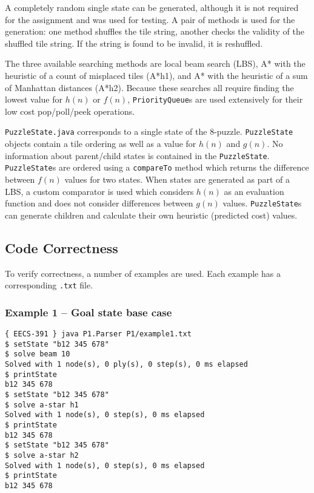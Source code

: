 \documentclass[letterpaper]{article}
\begin{document}
A completely random single state can be generated, although it is not required
for the assignment and was used for testing. A pair of methods is used for the
generation: one method shuffles the tile string, another checks the validity
of the shuffled tile string. If the string is found to be invalid, it is
reshuffled.

The three available searching methods are local beam search (LBS), A* with the
heuristic of a count of misplaced tiles (A*h1), and A* with the heuristic of a
sum of Manhattan distances (A*h2). Because these searches all require finding
the lowest value for $h(n)$ or $f(n)$, \texttt{PriorityQueue}s are used
extensively for their low cost pop/poll/peek operations.

\texttt{PuzzleState.java} corresponds to a single state of the 8-puzzle.
\texttt{PuzzleState} objects contain a tile ordering as well as a value for
$h(n)$ and $g(n)$. No information about parent/child states is contained in
the \texttt{PuzzleState}. \texttt{PuzzleState}s are ordered using a
\texttt{compareTo} method which returns the difference between $f(n)$ values
for two states. When states are generated as part of a LBS, a custom comparator
is used which considers $h(n)$ as an evaluation function and does not consider
differences between $g(n)$ values. \texttt{PuzzleState}s can generate children
and calculate their own heuristic (predicted cost) values.

\subsection*{Code Correctness}

To verify correctness, a number of examples are used. Each example has a
corresponding \texttt{.txt} file.

\subsubsection*{Example 1 -- Goal state base case}

\begin{verbatim}
{ EECS-391 } java P1.Parser P1/example1.txt
$ setState "b12 345 678"
$ solve beam 10
Solved with 1 node(s), 0 ply(s), 0 step(s), 0 ms elapsed
$ printState
b12 345 678
$ setState "b12 345 678"
$ solve a-star h1
Solved with 1 node(s), 0 step(s), 0 ms elapsed
$ printState
b12 345 678
$ setState "b12 345 678"
$ solve a-star h2
Solved with 1 node(s), 0 step(s), 0 ms elapsed
$ printState
b12 345 678
\end{verbatim}
\end{document}
